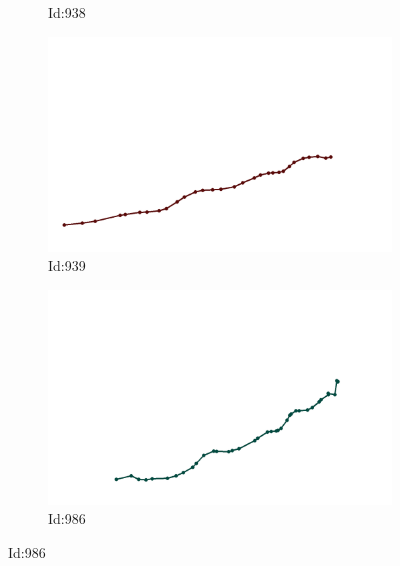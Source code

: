 \documentclass[12pt,twoside]{report}
\begin{document}
\begin{figure}
\begin{subfigure}[b]{0.20\textwidth}
\caption{Id:938}
\end{subfigure}
\begin{subfigure}[b]{0.20\textwidth}
\centering
\includegraphics[width=\textwidth]{../trajectories/939.png}
\caption{Id:939}
\end{subfigure}
\begin{subfigure}[b]{0.20\textwidth}
\centering
\includegraphics[width=\textwidth]{../trajectories/986.png}
\caption{Id:986}
\end{subfigure}
\end{figure}
\end{document}
